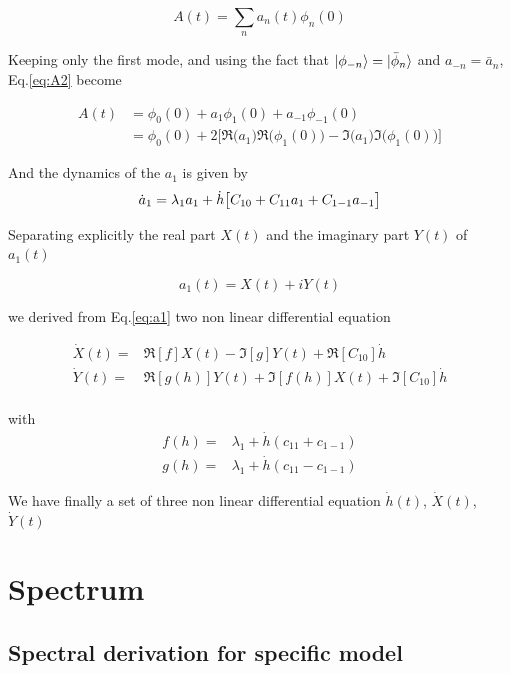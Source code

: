 \documentclass[a4paper,11pt,twoside]{article}
\numberwithin{equation}{section}
\begin{document}
\begin{equation}
\label{eq:A2}
A(t)=\sum_na_n(t)\phi_n(0)
\end{equation}

Keeping only the first mode, and using the fact that $\ket{\phi_{-n}}=\ket{\bar{\phi}_n}$ and $a_{-n}=\bar{a}_n$,  Eq.\eqref{eq:A2} become

\begin{align}
\label{eq:A3}
A(t)&=\phi_0(0) + a_1\phi_1(0) +a_{-1}\phi_{-1}(0) \nonumber \\
      &=\phi_0(0) + 2\big[\Re\big(a_1\big)\Re\big(\phi_1(0)\big)- \Im\big(a_1\big)\Im\big(\phi_1(0)\big)\big] 
\end{align}


And the dynamics of the $a_1$ is given by
\begin{equation}
\label{eq:a1}
\dot{a}_1=\lambda_1 a_1 + \dot{h}\big[C_{10}+C_{11}a_1+C_{1-1}a_{-1}\big] \nonumber \\
\end{equation}

Separating explicitly the real part $X(t)$ and the imaginary part  $Y(t)$ of $a_1(t)$

 \begin{equation}
 \label{eq:a1xy}
 a_1(t)= X(t) +i Y(t)
 \end{equation}
 
 we derived from Eq.\eqref{eq:a1}  two non linear differential equation

\begin{align}
\dot{X}(t)=&\Re[f]X(t)-\Im[g]Y(t) +\Re[C_{10}]\dot{h}\\
\dot{Y}(t)=&\Re[g(h)]Y(t)+\Im[f(h)]X(t) +\Im[C_{10}]\dot{h}\\
\end{align}

with
\begin{align}
f(h)=&\lambda_1+ \dot{h}(c_{11}+c_{1-1})\\
g(h)=&\lambda_1+ \dot{h}(c_{11}-c_{1-1})
\end{align}

We have finally a set of three non linear differential equation $\dot{h}(t)$, $\dot{X}(t)$, $\dot{Y}(t)$


\section{Spectrum}
\subsection{Spectral derivation for specific model}
\label{sec:specif-model}
\end{document}
